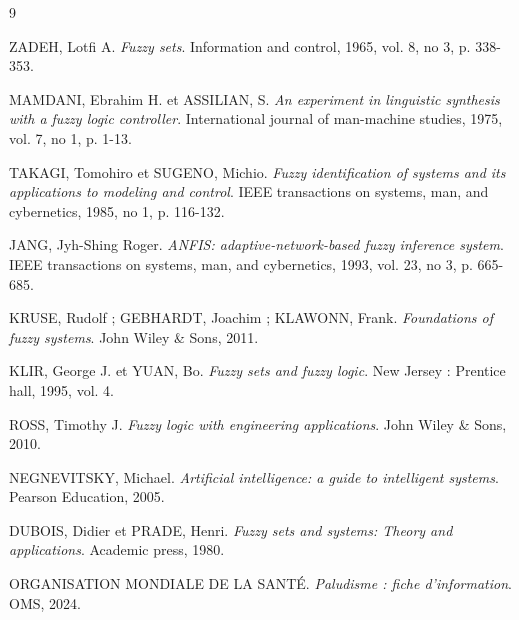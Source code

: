 \documentclass[a4paper,12pt]{report} %
\begin{document}
\newpage
\begin{thebibliography}{9}

ZADEH, Lotfi A. \textit{Fuzzy sets}. Information and control, 1965, vol. 8, no 3, p. 338-353.

MAMDANI, Ebrahim H. et ASSILIAN, S. \textit{An experiment in linguistic synthesis with a fuzzy logic controller}. International journal of man-machine studies, 1975, vol. 7, no 1, p. 1-13.

TAKAGI, Tomohiro et SUGENO, Michio. \textit{Fuzzy identification of systems and its applications to modeling and control}. IEEE transactions on systems, man, and cybernetics, 1985, no 1, p. 116-132.

JANG, Jyh-Shing Roger. \textit{ANFIS: adaptive-network-based fuzzy inference system}. IEEE transactions on systems, man, and cybernetics, 1993, vol. 23, no 3, p. 665-685.

KRUSE, Rudolf ; GEBHARDT, Joachim ; KLAWONN, Frank. \textit{Foundations of fuzzy systems}. John Wiley \& Sons, 2011.

KLIR, George J. et YUAN, Bo. \textit{Fuzzy sets and fuzzy logic}. New Jersey : Prentice hall, 1995, vol. 4.

ROSS, Timothy J. \textit{Fuzzy logic with engineering applications}. John Wiley \& Sons, 2010.

NEGNEVITSKY, Michael. \textit{Artificial intelligence: a guide to intelligent systems}. Pearson Education, 2005.

DUBOIS, Didier et PRADE, Henri. \textit{Fuzzy sets and systems: Theory and applications}. Academic press, 1980.

ORGANISATION MONDIALE DE LA SANTÉ. \textit{Paludisme : fiche d'information}. OMS, 2024.

\end{thebibliography}
\end{document}
